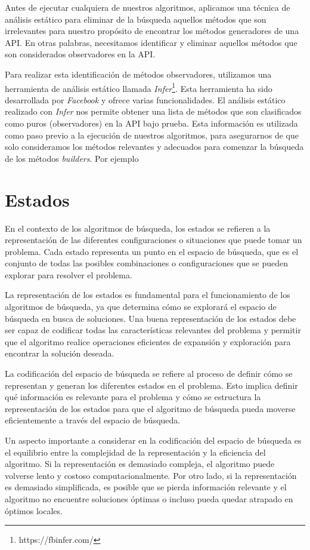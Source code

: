 Antes de ejecutar cualquiera de nuestros algoritmos, aplicamos una técnica de análisis estático
para eliminar de la búsqueda aquellos métodos que son irrelevantes para nuestro propósito de encontrar los métodos generadores de una API. En otras palabras, necesitamos identificar y eliminar aquellos métodos que son considerados observadores en la API.

Para realizar esta identificación de métodos observadores, utilizamos una
herramienta de análisis estático llamada
\emph{Infer}\footnote{https://fbinfer.com/}. Esta herramienta ha sido
desarrollada por \emph{Facebook} y ofrece varias funcionalidades. El análisis estático realizado con \emph{Infer} nos permite obtener una lista de métodos que son clasificados como puros (observadores) \cite{Huang:2012} en la API bajo prueba. Esta
información es utilizada como paso previo a la ejecución de nuestros algoritmos, para asegurarnos de que solo consideramos los métodos relevantes y adecuados para comenzar la búsqueda de los métodos \emph{builders}. 
Por ejemplo
\section{Estados}
\label{sec:estados}
En el contexto de los algoritmos de búsqueda, los estados se refieren a la representación de las diferentes configuraciones o situaciones que puede tomar un problema. Cada estado representa un punto en el espacio de búsqueda, que es el conjunto de todas las posibles combinaciones o configuraciones que se pueden explorar para resolver el problema.

La representación de los estados es fundamental para el funcionamiento de los algoritmos de búsqueda, ya que determina cómo se explorará el espacio de búsqueda en busca de soluciones. Una buena representación de los estados debe ser capaz de codificar todas las características relevantes del problema y permitir que el algoritmo realice operaciones eficientes de expansión y exploración para encontrar la solución deseada.

La codificación del espacio de búsqueda se refiere al proceso de definir cómo se representan y generan los diferentes estados en el problema. Esto implica definir qué información es relevante para el problema y cómo se estructura la representación de los estados para que el algoritmo de búsqueda pueda moverse eficientemente a través del espacio de búsqueda.

Un aspecto importante a considerar en la codificación del espacio de búsqueda es el equilibrio entre la complejidad de la representación y la eficiencia del algoritmo. Si la representación es demasiado compleja, el algoritmo puede volverse lento y costoso computacionalmente. Por otro lado, si la representación es demasiado simplificada, es posible que se pierda información relevante y el algoritmo no encuentre soluciones óptimas o incluso pueda quedar atrapado en óptimos locales.

